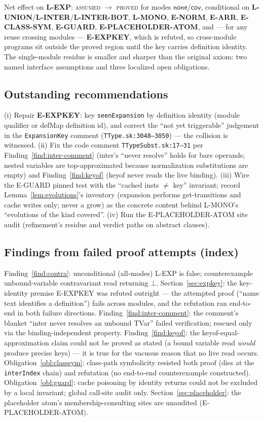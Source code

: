 \documentclass[11pt]{article}
\newcommand{\Cov}{\mathsf{cov}}
\newcommand{\NoneM}{\mathsf{none}}
\begin{document}
Net effect on \textbf{L-EXP}: \textsc{assumed} $\to$ \textsc{proved}
for modes $\NoneM$/$\Cov$, conditional on
\textbf{L-UNION}/\textbf{L-INTER}/\textbf{L-INTER-BOT}, \textbf{L-MONO}, \textbf{E-NORM},
\textbf{E-ARR}, \textbf{E-CLASS-SYM}, \textbf{E-GUARD},
\textbf{E-PLACEHOLDER-ATOM}, and — for any reuse crossing modules —
\textbf{E-EXPKEY}, which is refuted, so cross-module programs sit
outside the proved region until the key carries definition identity.
The single-module residue is smaller and sharper than the original
axiom: two named interface assumptions and three localized open
obligations.

\subsection{Outstanding recommendations}
(i) Repair \textbf{E-EXPKEY}: key \texttt{seenExpansion} by definition
identity (module qualifier or defMap definition id), and correct the
``not yet triggerable'' judgement in the \texttt{ExpansionKey} comment
(\texttt{TType.sk:3048--3050}) — the collision is witnessed.
(ii) Fix the code comment \texttt{TTypeSubst.sk:17--31} per
Finding~\ref{find:inter-comment} (inter's ``never resolve'' holds for
bare operands; nested variables are top-approximated because
normalization substitutions are empty) and Finding~\ref{find:keyof}
(keyof never reads the live binding).
(iii) Wire the E-GUARD pinned test with the ``cached insts $\neq$ key''
invariant; record Lemma~\ref{lem:evolutions}'s inventory (expansion
performs get-transitions and cache writes only; never a grow) as the
concrete content behind L-MONO's ``evolutions of the kind covered''.
(iv) Run the E-PLACEHOLDER-ATOM site audit (refinement's residue and
verdict paths on abstract clauses).

\subsection{Findings from failed proof attempts (index)}

Finding~\ref{find:contra}: unconditional (all-modes) L-EXP is false;
counterexample unbound-variable contravariant read returning $\bot$.
Section~\ref{sec:expkey}: the key-identity premise E-EXPKEY was
refuted outright — the attempted proof (``name text identifies a
definition'') fails across modules, and the refutation ran end-to-end
in both failure directions.
Finding~\ref{find:inter-comment}: the comment's blanket
``inter never resolves an unbound TVar'' failed verification; rescued
only via the binding-independent property.
Finding~\ref{find:keyof}: the keyof-equal-approximation claim could not
be proved as stated (a bound variable read \emph{would} produce precise
keys) — it is true for the vacuous reason that no live read occurs.
Obligation~\ref{obl:classsym}: class-path symbolicity resisted both
proof (dies at the \texttt{interIndex} chain) and refutation (no
end-to-end counterexample constructed).
Obligation~\ref{obl:guard}: cache poisoning by identity returns could
not be excluded by a local invariant; global call-site audit only.
Section~\ref{sec:placeholder}: the placeholder atom's
membership-consulting sites are unaudited (E-PLACEHOLDER-ATOM).
\end{document}
